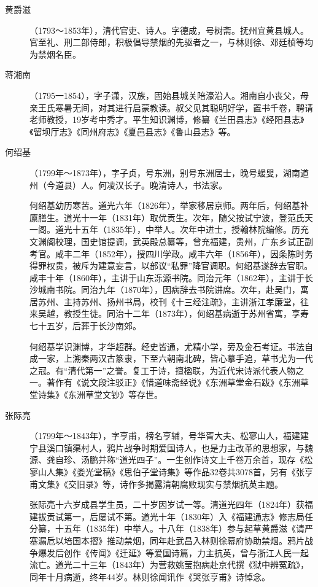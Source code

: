 \begin{description}
  \item[黄爵滋] （1793～1853年），清代官吏、诗人。字德成，号树斋。抚州宜黄县城人。官至礼、刑二部侍郎，积极倡导禁烟的先驱者之一，与林则徐、邓廷桢等均为禁烟名臣。
  \item[蒋湘南] （1795一1854），字子潇，汉族，固始县城关陪濠沿人。湘南自小丧父，母亲王氏寒暑无间，对其进行启蒙教读。叔父见其聪明好学，置书千卷，聘请老师教授，19岁考中秀才。平生知识渊博，修纂《兰田县志》《经阳县志》《留坝厅志》《同州府志》《夏邑县志》《鲁山县志》等。
  \item[何绍基] （1799年～1873年），字子贞，号东洲，别号东洲居士，晚号蝯叟，湖南道州（今道县）人。何凌汉长子。晚清诗人，书法家。\par
        何绍基幼历寒苦。道光六年（1826年），举家移居京师。两年后，何绍基补廪膳生。道光十一年（1831年）取优贡生。次年，随父按试宁波，登范氏天一阁。道光十五年（1835年），中举人。次年中进士，授翰林院编修。历充文渊阁校理，国史馆提调，武英殿总纂等，曾充福建，贵州，广东乡试正副考官。咸丰二年（1852年），授四川学政。咸丰六年（1856年），因条陈时务得罪权贵，被斥为建意妄言，以部议“私罪”降官调职。何绍基遂辞去官职。咸丰十年（1860年），主讲于山东泺源书院。同治元年（1862年），主讲于长沙城南书院。同治九年（1870年），因病辞去书院讲席。次年，赴吴门，寓居苏州、主持苏州、扬州书局，校刊《十三经注疏》，主讲浙江孝廉堂，往来吴越，教授生徒。同治十二年（1873年），何绍基病逝于苏州省寓，享寿七十五岁，后葬于长沙南郊。\par
        何绍基学识渊博，才华超群。经史皆通，尤精小学，旁及金石考证。书法自成一家，上溯秦两汉古篆隶，下至六朝南北碑，皆心摹手追，草书尤为一代之冠。有“清代第一”之誉。复工于诗，擅楹联，为近代宋诗派代表人物之一。著作有《说文段注驳正》《惜道味斋经说》《东洲草堂金石跋》《东洲草堂诗集》《东洲草堂文钞》等存世。
  \item[张际亮] （1799年～1843年），字亨甫，榜名亨辅，号华胥大夫、松寥山人，福建建宁县溪口镇渠村人，鸦片战争时期爱国诗人，也是力主改革的思想家，与魏源、龚自珍、汤鹏并称“道光四子”。一生创作诗文上千卷万余首，现存《松寥山人集》《娄光堂稿》《思伯子堂诗集》等作品32卷共3078首，另有《张亨甫文集》《交旧录》等，诗作多揭露清朝腐败现实与禁烟抗英主题。\par
        张际亮十六岁成县学生员，二十岁因岁试一等。清道光四年（1824年）获福建拔贡试第一，后屡试不第。道光十年（1830年）入《福建通志》修志局任分纂，十五年（1835年）中举人。十八年（1838年）参与起草黄爵滋《请严塞漏卮以培国本摺》推动禁烟，同年赴武昌入林则徐幕府协助禁烟。鸦片战争爆发后创作《传闻》《迁延》等爱国诗篇，力主抗英，曾与浙江人民一起流亡。道光二十三年（1843年）为营救姚莹抱病赴京代撰《狱中辨冤疏》，同年十月病逝，终年44岁。林则徐闻讯作《哭张亨甫》诗悼念。

\end{description}
